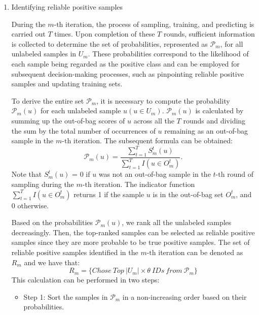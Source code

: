 \documentclass[10pt,journal,compsoc]{IEEEtran}
\begin{document}
\begin{enumerate}[label=(\arabic*)]
	\item Identifying reliable positive samples
	
	During the $m\text{-th}$ iteration, the process of sampling, training, and predicting is carried out $T$ times. Upon completion of these $T$ rounds, sufficient information is collected to determine the set of probabilities, represented as ${{\mathsf{\mathcal{P}}}_{m}}$, for all unlabeled samples in ${{U}_{m}}$. These probabilities correspond to the likelihood of each sample being regarded as the positive class and can be employed for subsequent decision-making processes, such as pinpointing reliable positive samples and updating training sets.
	
	To derive the entire set ${{\mathsf{\mathcal{P}}}_{m}}$, it is necessary to compute the probability ${{\mathsf{\mathcal{P}}}_{m}}(u)$ for each unlabeled sample $u(u\in {{U}_{m}})$. ${{\mathsf{\mathcal{P}}}_{m}}(u)$ is calculated by summing up the out-of-bag scores of $u$ across all the $T$ rounds and dividing the sum by the total number of occurrences of $u$ remaining as an out-of-bag sample in the $m\text{-th}$ iteration. The subsequent formula can be obtained:
	\begin{equation}
		{{\mathsf{\mathcal{P}}}_{m}}(u)=\frac{\sum\nolimits_{t=1}^{T}{S_{m}^{t}}(u)}{\sum\nolimits_{t=1}^{T}{I(u\in O_{m}^{t})}}.
	\end{equation}
	Note that $S_{m}^{t}(u)$ = 0 if $u$ was not an out-of-bag sample in the $t\text{-th}$ round of sampling during the $m\text{-th}$ iteration. The indicator function $\sum\nolimits_{t=1}^{T}{I(u\in O_{m}^{t})}$ returns 1 if the sample $u$ is in the out-of-bag set $O_{m}^{t}$, and 0 otherwise. 
	
	Based on the probabilities ${{\mathsf{\mathcal{P}}}_{m}}(u)$, we rank all the unlabeled samples decreasingly. Then, the top-ranked samples can be selected as reliable positive samples since they are more probable to be true positive samples. The set of reliable positive samples identified in the $m\text{-th}$ iteration can be denoted as ${{R}_{m}}$ and we have that:
	\begin{equation}
		{{R}_{m}}=\{Chose\ Top\ |{{U}_{m}}|\times \theta \ IDs\ from\ {{\mathsf{\mathcal{P}}}_{m}}\}
	\end{equation}
	This calculation can be performed in two steps:
	\begin{itemize}
		\item Step 1: Sort the samples in ${{\mathsf{\mathcal{P}}}_{m}}$ in a non-increasing order based on their probabilities.
		

\end{itemize}
\end{enumerate}
\end{document}
